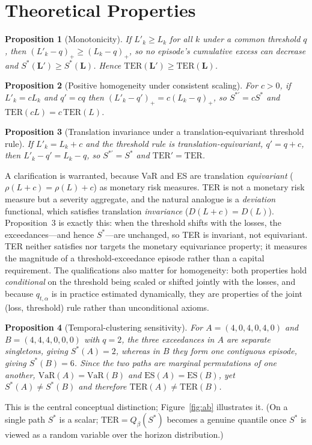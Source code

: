 \documentclass[11pt]{article}
\newtheorem{proposition}{Proposition}
\newcommand{\VaR}{\mathrm{VaR}}
\newcommand{\ES}{\mathrm{ES}}
\newcommand{\TER}{\mathrm{TER}}
\begin{document}
\section{Theoretical Properties}\label{sec:theory}

\begin{proposition}[Monotonicity]
If $L'_k\ge L_k$ for all $k$ under a common threshold $q$, then $(L'_k-q)_+\ge(L_k-q)_+$, so no episode's
cumulative excess can decrease and $S^{*}(\mathbf L')\ge S^{*}(\mathbf L)$. Hence
$\TER(\mathbf L')\ge \TER(\mathbf L)$.
\end{proposition}

\begin{proposition}[Positive homogeneity under consistent scaling]
For $c>0$, if $L'_k=cL_k$ and $q'=cq$ then $(L'_k-q')_+=c(L_k-q)_+$, so $S^{*\prime}=cS^{*}$ and
$\TER(cL)=c\,\TER(L)$.
\end{proposition}

\begin{proposition}[Translation invariance under a translation-equivariant threshold rule]
If $L'_k=L_k+c$ and the threshold rule is translation-equivariant, $q'=q+c$, then $L'_k-q'=L_k-q$, so
$S^{*\prime}=S^{*}$ and $\TER'=\TER$.
\end{proposition}
\noindent A clarification is warranted, because VaR and ES are translation \emph{equivariant}
($\rho(L+c)=\rho(L)+c$) as monetary risk measures. TER is not a monetary risk measure but a severity
aggregate, and the natural analogue is a \emph{deviation} functional, which satisfies translation
\emph{invariance} ($D(L+c)=D(L)$). Proposition~3 is exactly this: when the threshold shifts with the losses,
the exceedances---and hence $S^{*}$---are unchanged, so TER is invariant, not equivariant. TER neither
satisfies nor targets the monetary equivariance property; it measures the magnitude of a
threshold-exceedance episode rather than a capital requirement. The qualifications also matter for
homogeneity: both properties hold \emph{conditional} on the threshold being scaled or shifted jointly with
the losses, and because $q_{t,\alpha}$ is in practice estimated dynamically, they are properties of the
joint (loss, threshold) rule rather than unconditional axioms.

\begin{proposition}[Temporal-clustering sensitivity]
For $A=(4,0,4,0,4,0)$ and $B=(4,4,4,0,0,0)$ with $q=2$, the three exceedances in $A$ are separate
singletons, giving $S^{*}(A)=2$, whereas in $B$ they form one contiguous episode, giving $S^{*}(B)=6$.
Since the two paths are marginal permutations of one another, $\VaR(A)=\VaR(B)$ and $\ES(A)=\ES(B)$, yet
$S^{*}(A)\ne S^{*}(B)$ and therefore $\TER(A)\ne\TER(B)$.
\end{proposition}
\noindent This is the central conceptual distinction; Figure~\ref{fig:ab} illustrates it. (On a single path
$S^{*}$ is a scalar; $\TER=Q_\beta(S^{*})$ becomes a genuine quantile once $S^{*}$ is viewed as a random
variable over the horizon distribution.)
\end{document}
